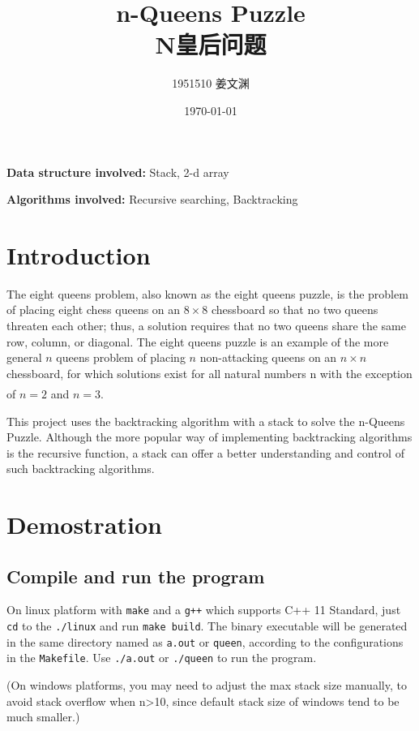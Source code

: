 \documentclass[cn,black,12pt,normal]{elegantnote}
\title{n-Queens Puzzle\\N皇后问题}
\author{1951510\; 姜文渊}
\institute{\small \url{https://github.com/jwyjohn/Jwy_DataStructureHomework}}
\date{\today}
\newcommand{\uct}[1]{\textsuperscript{\textsuperscript{\cite{#1}}}}
\begin{document}
\maketitle

\textbf{Data structure involved:} Stack, 2-d array

\textbf{Algorithms involved:} Recursive searching, Backtracking

\tableofcontents

\newpage

\section{Introduction}

The eight queens problem, also known as the eight queens puzzle, is the problem of placing eight chess queens on an $8 \times 8$ chessboard so that no two queens threaten each other; thus, a solution requires that no two queens share the same row, column, or diagonal. The eight queens puzzle is an example of the more general $n$ queens problem of placing $n$ non-attacking queens on an $n \times n$ chessboard, for which solutions exist for all natural numbers n with the exception of $n = 2$ and $n = 3$.\uct{wiki:Eight_queens_puzzle}

This project uses the backtracking algorithm with a stack to solve the n-Queens Puzzle. Although the more popular way of implementing backtracking algorithms is the recursive function, a stack can offer a better understanding and control of such backtracking algorithms.

\section{Demostration}

\subsection{Compile and run the program}

On linux platform with \lstinline{make} and a \lstinline{g++} which supports C++ 11 Standard, just \lstinline{cd} to the \lstinline{./linux} and run \lstinline{make build}. The binary executable will be generated in the same directory named as \lstinline{a.out} or \lstinline{queen}, according to the configurations in the \lstinline{Makefile}. Use \lstinline{./a.out} or \lstinline{./queen} to run the program.

(On windows platforms, you may need to adjust the max stack size manually, to avoid stack overflow when n>10, since default stack size of windows tend to be much smaller.)
\end{document}
